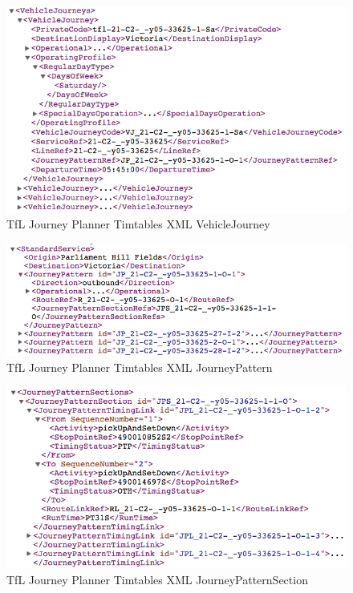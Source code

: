 \begin{figure}
\centering
\includegraphics[width=\textwidth]{figures/xml_vehicle_journeys.png}
\caption{\label{fig:xml_vehicle_journeys} TfL Journey Planner Timtables XML VehicleJourney}
\end{figure}


\begin{figure}
\centering
\includegraphics[width=\textwidth]{figures/xml_journeypattern.png}
\caption{\label{fig:xml_journeypattern} TfL Journey Planner Timtables XML JourneyPattern}
\end{figure}

\begin{figure}
\centering
\includegraphics[width=\textwidth]{figures/xml_journey_pattern_section.png}
\caption{\label{fig:xml_journey_pattern_section} TfL Journey Planner Timtables XML JourneyPatternSection}
\end{figure}

